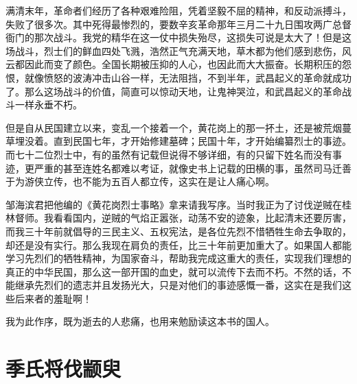 \documentclass[12pt,UTF-8,openany,a4]{ctexbook}
\begin{document}
\begin{large}
    \yiwen 
    满清末年，革命者们经历了各种艰难险阻，凭着坚毅不屈的精神，和反动派搏斗，失败了很多次。其中死得最惨烈的，要数辛亥革命那年三月二十九日围攻两广总督衙门的那次战斗。我党的精华在这一仗中损失殆尽，这损失可说是太大了！但是这场战斗，烈士们的鲜血四处飞溅，浩然正气充满天地，草木都为他们感到悲伤，风云都因此而变了颜色。全国长期被压抑的人心，也因此而大大振奋。长期积压的怨恨，就像愤怒的波涛冲击山谷一样，无法阻挡，不到半年，武昌起义的革命就成功了。那么这场战斗的价值，简直可以惊动天地，让鬼神哭泣，和武昌起义的革命战斗一样永垂不朽。
    
    但是自从民国建立以来，变乱一个接着一个，黄花岗上的那一抔土，还是被荒烟蔓草埋没着。直到民国七年，才开始修建墓碑；民国十年，才开始编纂烈士的事迹。而七十二位烈士中，有的虽然有记载但说得不够详细，有的只留下姓名而没有事迹，更严重的甚至连姓名都难以考证，就像史书上记载的田横的事，虽然司马迁善于为游侠立传，也不能为五百人都立传，这实在是让人痛心啊。
    
    邹海滨君把他编的《黄花岗烈士事略》拿来请我写序。当时我正为了讨伐逆贼在桂林督师。我看看国内，逆贼的气焰正嚣张，动荡不安的迹象，比起清末还要厉害，而我三十年前就倡导的三民主义、五权宪法，是各位先烈不惜牺牲生命去争取的，却还是没有实行。那么我现在肩负的责任，比三十年前更加重大了。如果国人都能学习先烈们的牺牲精神，为国家奋斗，帮助我完成这重大的责任，实现我们理想的真正的中华民国，那么这一部开国的血史，就可以流传下去而不朽。不然的话，不能继承先烈们的遗志并且发扬光大，只是对他们的事迹感慨一番，这实在是我们这些后来者的羞耻啊！
    
    我为此作序，既为逝去的人悲痛，也用来勉励读这本书的国人。
    
\end{large}



\chapter{季氏将伐颛臾}
\end{document}
